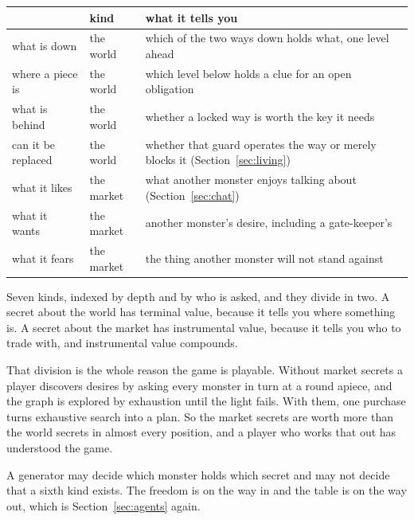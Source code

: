 \documentclass[11pt,a4paper]{article}
\begin{document}
\begin{center}
\begin{tabular}{@{}l@{\hspace{4mm}}l@{\hspace{4mm}}>{\raggedright\arraybackslash}p{}@{}}
\toprule
& \textbf{kind} & \textbf{what it tells you} \\
\midrule
what is down     & the world  & which of the two ways down holds what, one level ahead \\
where a piece is & the world  & which level below holds a clue for an open obligation \\
what is behind   & the world  & whether a locked way is worth the key it needs \\
can it be replaced & the world & whether that guard operates the way or merely blocks it (Section~\ref{sec:living}) \\
what it likes    & the market & what another monster enjoys talking about (Section~\ref{sec:chat}) \\
\midrule
what it wants    & the market & another monster's desire, including a gate-keeper's \\
what it fears    & the market & the thing another monster will not stand against \\
\bottomrule
\end{tabular}
\end{center}

Seven kinds, indexed by depth and by who is asked, and they divide in two. A secret about the world
has terminal value, because it tells you where something is. A secret about the market has
instrumental value, because it tells you who to trade with, and instrumental value compounds.

\begin{sectionbox}
That division is the whole reason the game is playable. Without market secrets a player discovers
desires by asking every monster in turn at a round apiece, and the graph is explored by exhaustion
until the light fails. With them, one purchase turns exhaustive search into a plan. So the market
secrets are worth more than the world secrets in almost every position, and a player who works
that out has understood the game.
\end{sectionbox}

A generator may decide which monster holds which secret and may not decide that a sixth kind
exists. The freedom is on the way in and the table is on the way out, which is
Section~\ref{sec:agents} again.
\end{document}
